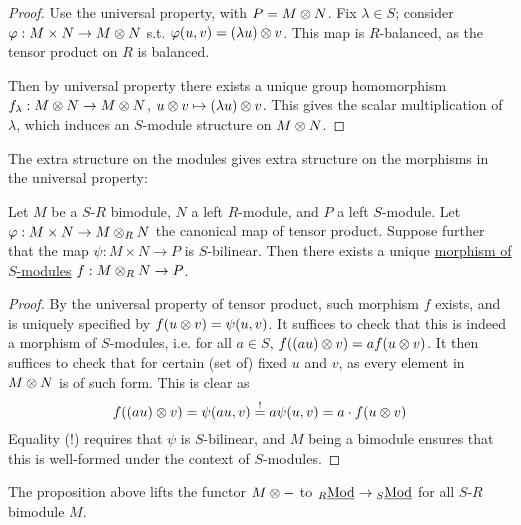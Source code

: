 \documentclass{article}
\begin{document}
\begin{proof}
    Use the universal property, with $P = M \otimes N$. Fix $\lambda \in S$; consider $\varphi: M \times N \to M \otimes N$ s.t. $\varphi(u, v) = (\lambda u) \otimes v$. This map is $R$-balanced, as the tensor product on $R$ is balanced. 
    
    Then by universal property there exists a unique group homomorphism $f_{\lambda}: M \otimes N \to M \otimes N$, $u \otimes v \mapsto (\lambda u) \otimes v$. This gives the scalar multiplication of $\lambda$, which induces an $S$-module structure on $M \otimes N$.
\end{proof}

\begin{proposition}
    The extra structure on the modules gives extra structure on the morphisms in the universal property:

    Let $M$ be a $S$-$R$ bimodule, $N$ a left $R$-module, and $P$ a left $S$-module. Let $\varphi: M \times N \to M \otimes_R N$ the canonical map of tensor product. Suppose further that the map $\psi: M \times N \to P$ is $S$-bilinear. Then there exists a unique \underline{morphism of $S$-modules} $f: M \otimes_R N \to P$.
\end{proposition}

\begin{proof}
    By the universal property of tensor product, such morphism $f$ exists, and is uniquely specified by $f(u \otimes v) = \psi(u, v)$. It suffices to check that this is indeed a morphism of $S$-modules, i.e. for all $a \in S$, $f((au) \otimes v) = a f(u \otimes v)$. It then suffices to check that for certain (set of) fixed $u$ and $v$, as every element in $M \otimes N$ is of such form. This is clear as
    \[
        f((au) \otimes v) = \psi(au, v) \overset{!}{=} a\psi(u, v) = a\cdot f(u \otimes v)
    \]
    Equality (!) requires that $\psi$ is $S$-bilinear, and $M$ being a bimodule ensures that this is well-formed under the context of $S$-modules. 
\end{proof}

\begin{remark}
    The proposition above lifts the functor $M \otimes -$ to ${}_{R}\underline{\textup{Mod}} \to {}_{S}\underline{\textup{Mod}}$ for all $S$-$R$ bimodule $M$.
\end{remark}
\end{document}
